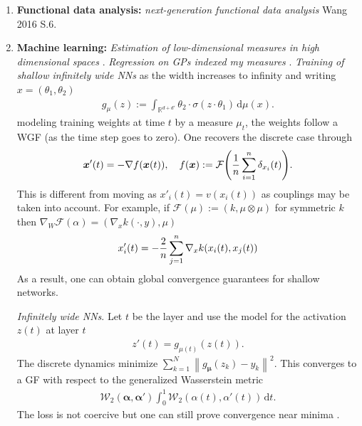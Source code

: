 \documentclass[
    a4paper,
    DIV=14,
    abstract=true,
    numbers=noenddot
]
{scrartcl}
\theoremstyle{definition}
\renewcommand{\b}[1]{{\bm{#1}}}
\renewcommand{\norm}[1]{\left\lVert #1 \right\rVert}\renewcommand{\abs}[1]{\left| #1 \right|}
\renewcommand{\d}{\,\mathrm{d}}\newcommand{\dx}{\,\mathrm{d}x}
\newcommand{\R}{\mathbb{R}}
\newcommand{\Ff}{\mathcal{F}}
\newcommand{\Oo}{\mathcal{O}}
\newcommand{\Ww}{\mathcal{W}}
\begin{document}
\begin{enumerate}
The equivalence between geodesics and transport maps was used in \cite{benamou2000computational} to try to infer the full geodesic. This turns the problem into a convex problem with linear constraints.

To get something convex and much faster one ads a penalization term. One then solves in the dual space as here the problem is unconstrained and requires updating $f,g \in \R^n$ instead of $P \in \R^{n\times n}$ constrained by the row and column sums. 
This makes the problem $\Oo (N^2)$.  Regularization using the KLD can be extended to dynamic formulations to get the SBP and to the dual to get the viscous HJB equation.  \cite{benamou2000computational}.

There is some work on trying to maximise the dual problem too


exhibits many favourable  
\item \textbf{Functional data analysis:} \emph{next-generation functional data analysis} Wang 2016 S.6.
\item \textbf{Machine learning:} \emph{Estimation of low-dimensional measures in high dimensional spaces} \cite{canas2012learning}. \emph{Regression on GPs indexed my measures} \cite{bachoc2017gaussian}.
\emph{Training of shallow infinitely wide NNs } as the width increases to infinity and writing $x=(\theta_1, \theta_2)$  
\begin{align*}
    g_\mu(z):= \int_{\R^{d+d'}} \theta_2 \cdot \sigma(z \cdot \theta_1) \d \mu(x). 
\end{align*}
modeling training weights at time $t$  by a measure $\mu_t$, the weights follow a WGF (as the time step goes to zero). One recovers the discrete case through 
\begin{align*}
    \b{x}'(t) = -\nabla f(\b{x}(t)), \quad f(\b{x}):= \Ff \qty(\frac{1}{n} \sum_{i=1}^n \delta _{x_i}(t) ).
\end{align*}
This is different from moving as $x'_i(t)=v(x_i(t))$ as couplings may be taken into account. For example, if $\Ff(\mu ):= (k, \mu \otimes \mu )$ for symmetric $k$  then $\nabla _W \Ff (\alpha)= (\nabla_x k(\cdot ,y), \mu )$ 
\begin{align*}
    x'_i(t)= -\frac{2}{n}\sum_{j=1}^n \nabla_x k\qty(x_i(t) ,x_j(t))
\end{align*}
As a result, one can obtain global convergence guarantees for shallow networks.


\emph{Infinitely wide NNs}. Let $t$ be the layer and use the model for the activation $z(t)$ at layer $t$   
\begin{align*}
    z'(t)=g_{\mu(t)}(z(t)).
\end{align*}
 The discrete dynamics minimize $ \sum_{k=1}^N \norm{g_\b{\mu}(z_k)-y_k}^2$. This converges to a GF with  respect to the generalized Wasserstein metric
 \begin{align*}
   \Ww_2( \b{\alpha}, \b{\alpha}') \int_{0}^1 \Ww _2(\alpha(t), \alpha'(t)) \d t .
 \end{align*}
 The loss is not coercive but one can still prove convergence near minima \cite{peyre2025optimal}.
 

\end{enumerate}
\end{document}
